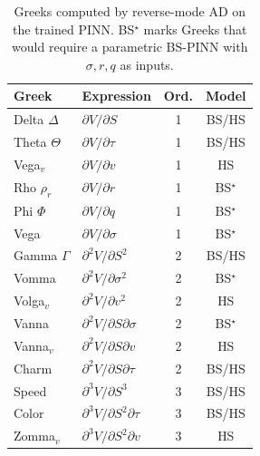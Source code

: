 \begin{table}[!htbp]
    \centering
    \footnotesize
    \setlength{\tabcolsep}{3pt}
    \renewcommand{\arraystretch}{1.05}
    \caption{Greeks computed by reverse-mode AD on the trained PINN. BS$^\star$ marks Greeks that would require a parametric BS-PINN with $\sigma,r,q$ as inputs.}
    \label{tab:greeks_expressions}
    \begin{tabularx}{\linewidth}{@{} l X c c @{}}
        \toprule
        \textbf{Greek} & \textbf{Expression} & \textbf{Ord.} & \textbf{Model} \\
        \midrule
        Delta $\Delta$       & $\partial V/\partial S$               & 1 & BS/HS \\
        Theta $\Theta$       & $\partial V/\partial \tau$            & 1 & BS/HS \\
        Vega$_v$             & $\partial V/\partial v$               & 1 & HS \\
        Rho $\rho_r$         & $\partial V/\partial r$               & 1 & BS$^\star$ \\
        Phi $\Phi$           & $\partial V/\partial q$               & 1 & BS$^\star$ \\
        Vega                 & $\partial V/\partial \sigma$          & 1 & BS$^\star$ \\
        Gamma $\Gamma$       & $\partial^2 V/\partial S^2$           & 2 & BS/HS \\
        Vomma                & $\partial^2 V/\partial \sigma^2$      & 2 & BS$^\star$ \\
        Volga$_v$            & $\partial^2 V/\partial v^2$           & 2 & HS \\
        Vanna                & $\partial^2 V/\partial S\partial\sigma$ & 2 & BS$^\star$ \\
        Vanna$_v$            & $\partial^2 V/\partial S\partial v$   & 2 & HS \\
        Charm                & $\partial^2 V/\partial S\partial \tau$ & 2 & BS/HS \\
        Speed                & $\partial^3 V/\partial S^3$           & 3 & BS/HS \\
        Color                & $\partial^3 V/\partial S^2\partial\tau$ & 3 & BS/HS \\
        Zomma$_v$            & $\partial^3 V/\partial S^2\partial v$ & 3 & HS \\
        \bottomrule
    \end{tabularx}
\end{table}

